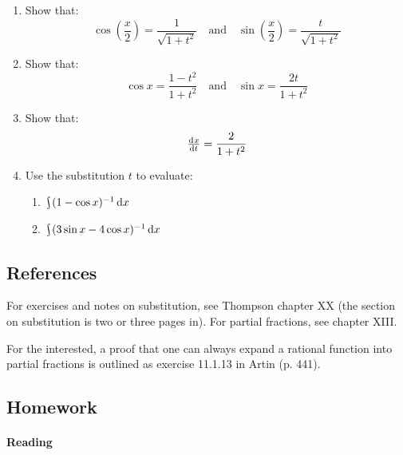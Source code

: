 \begin{enumerate}[resume]
    \begin{enumerate}
      \item Show that:
            \begin{displaymath}
              \cos\left( \frac{x}{2} \right) = \frac{1}{\sqrt{1 + t^2}} \quad\text{and}\quad \sin\left(\frac{x}{2}\right) = \frac{t}{\sqrt{1 + t^2}}
            \end{displaymath}
      \item Show that:
            \begin{displaymath}
              \cos x = \frac{1 - t^2}{1 + t^2} \quad\text{and}\quad \sin x = \frac{2t}{1 + t^2}
            \end{displaymath}
      \item Show that:
            \begin{displaymath}
              \od{x}{t} = \frac{2}{1 + t^2}
            \end{displaymath}
      \item Use the substitution $ t $ to evaluate:
        \begin{enumerate}
          \item $ \rint (1 - \cos x)^{-1} \dif{x} $
          \item $ \rint (3\sin x - 4\cos x)^{-1} \dif{x} $
        \end{enumerate}
    \end{enumerate}
\end{enumerate}

\subsection{References}
For exercises and notes on substitution, see Thompson chapter XX (the section on substitution
is two or three pages in). For partial fractions, see chapter XIII.

For the interested, a proof that one can always expand a rational function into partial fractions
is outlined as exercise 11.1.13 in Artin (p. 441).

\subsection{Homework}
\paragraph{Reading}

